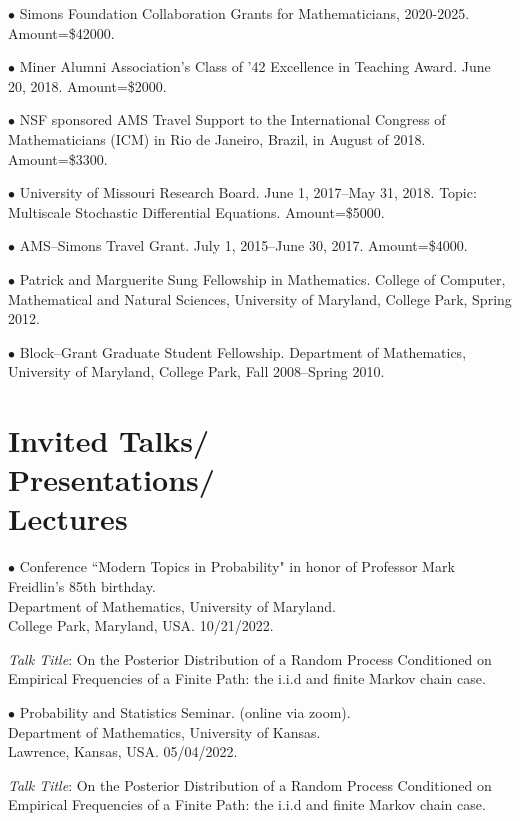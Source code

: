 \documentclass[margin,line]{res}
\begin{document}
\begin{resume}
$\bullet$ Simons Foundation Collaboration Grants for Mathematicians, 2020-2025. Amount=\$42000.

$\bullet$ Miner Alumni Association's Class of '42 Excellence in Teaching Award. June 20, 2018. Amount=\$2000.

$\bullet$ NSF sponsored AMS Travel Support to the International Congress of Mathematicians (ICM) in Rio de Janeiro, Brazil, in August of 2018. Amount=\$3300.

$\bullet$ University of Missouri Research Board. June 1, 2017--May 31, 2018. Topic: Multiscale Stochastic Differential Equations. Amount=\$5000.

$\bullet$ AMS--Simons Travel Grant. July 1, 2015--June 30, 2017. Amount=\$4000.

$\bullet$ Patrick and Marguerite Sung Fellowship in Mathematics.
College of Computer, Mathematical and Natural Sciences, University
of Maryland, College Park, Spring 2012.

$\bullet$ Block--Grant Graduate Student Fellowship. Department of Mathematics, University
of Maryland, College Park, Fall 2008--Spring 2010.



\section{\sc Invited Talks/\\Presentations/\\Lectures}

{$\bullet$ Conference       ``Modern Topics in Probability" in honor of Professor Mark Freidlin's 85th birthday. \\ Department of Mathematics, University of Maryland. \\
College Park, Maryland, USA.} \hfill 10/21/2022.

\textit{Talk Title}: On the Posterior Distribution of a Random Process Conditioned on Empirical Frequencies of a Finite Path: the i.i.d and finite Markov chain case.

{$\bullet$ Probability and Statistics Seminar. (online via zoom). \\ Department of Mathematics, University of Kansas. \\
Lawrence, Kansas, USA.} \hfill 05/04/2022.

\textit{Talk Title}: On the Posterior Distribution of a Random Process Conditioned on Empirical Frequencies of a Finite Path: the i.i.d and finite Markov chain case.



\end{resume}
\end{document}
